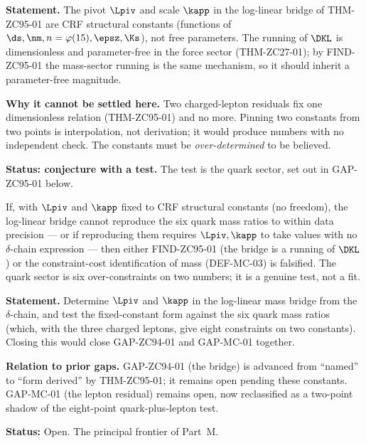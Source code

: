 \documentclass[12pt, a4paper]{article}
\begin{document}
\begin{openqbox}[title={CONJ-ZC95-01: The Bridge Constants Are Structural}]
\textbf{Statement.} The pivot $\Lpiv$ and scale $\kapp$ in the log-linear bridge
of THM-ZC95-01 are CRF structural constants (functions of
$\ds,\nm,n=\varphi(15),\epsz,\Ks$), not free parameters. The running of $\DKL$
is dimensionless and parameter-free in the force sector (THM-ZC27-01); by
FIND-ZC95-01 the mass-sector running is the same mechanism, so it should
inherit a parameter-free magnitude.

\textbf{Why it cannot be settled here.} Two charged-lepton residuals fix one
dimensionless relation (THM-ZC95-01) and no more. Pinning two constants from two
points is interpolation, not derivation; it would produce numbers with no
independent check. The constants must be \emph{over-determined} to be believed.

\textbf{Status: conjecture with a test.} The test is the quark sector, set out
in GAP-ZC95-01 below.
\end{openqbox}

\begin{fsbox}[title={FS-M-02: Falsification Signature for CONJ-ZC95-01}]
If, with $\Lpiv$ and $\kapp$ fixed to CRF structural constants (no freedom), the
log-linear bridge cannot reproduce the six quark mass ratios to within data
precision --- or if reproducing them requires $\Lpiv,\kapp$ to take values with
no $\delta$-chain expression --- then either FIND-ZC95-01 (the bridge is a
running of $\DKL$) or the constraint-cost identification of mass (DEF-MC-03) is
falsified. The quark sector is six over-constraints on two numbers; it is a
genuine test, not a fit.
\end{fsbox}

\begin{openqbox}[title={GAP-ZC95-01: Pin or Falsify the Bridge Constants
  (Priority 1 --- handed to ZC96)}]
\textbf{Statement.} Determine $\Lpiv$ and $\kapp$ in the log-linear mass bridge
from the $\delta$-chain, and test the fixed-constant form against the six quark
mass ratios (which, with the three charged leptons, give eight constraints on
two constants). Closing this would close GAP-ZC94-01 and GAP-MC-01 together.

\textbf{Relation to prior gaps.} GAP-ZC94-01 (the bridge) is advanced from
``named'' to ``form derived'' by THM-ZC95-01; it remains open pending these
constants. GAP-MC-01 (the lepton residual) remains open, now reclassified as a
two-point shadow of the eight-point quark-plus-lepton test.

\textbf{Status:} Open. The principal frontier of Part~M.
\end{openqbox}
\end{document}
